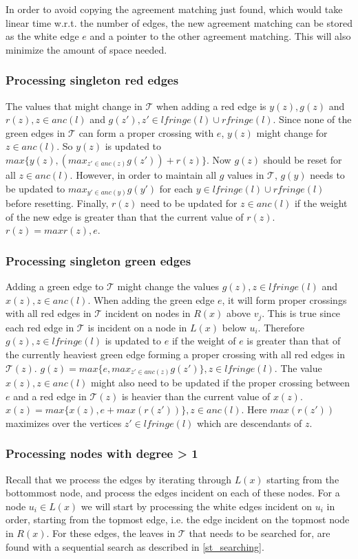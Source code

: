 In order to avoid copying the agreement matching just found, which would take linear time w.r.t. the number of edges, the new agreement matching can be stored as the white edge $e$ and a pointer to the other agreement matching. This will also minimize the amount of space needed.

\subsubsection{Processing singleton red edges}
The values that might change in $\mathcal{T}$ when adding a red edge is $y(z), g(z)$ and $r(z), z \in anc(l)$ and $g(z'), z' \in lfringe(l) \cup rfringe(l)$. Since none of the green edges in $\mathcal{T}$ can form a proper crossing with $e$, $y(z)$ might change for $z \in anc(l)$. So $y(z)$ is updated to $max\{y(z), (max_{z' \in anc(z)} g(z')) + r(z)\}$. Now $g(z)$ should be reset for all $z \in anc(l)$. However, in order to maintain all $g$ values in $\mathcal{T}$, $g(y)$ needs to be updated to $max_{y' \in anc(y)} g(y')$ for each $y \in lfringe(l) \cup rfringe(l)$ before resetting. Finally, $r(z)$ need to be updated for $z \in anc(l)$ if the weight of the new edge is greater than that the current value of $r(z)$. $r(z)=max{r(z), e}$.

\subsubsection{Processing singleton green edges}
Adding a green edge to $\mathcal{T}$ might change the values $g(z), z \in lfringe(l)$ and $x(z), z \in anc(l)$. When adding the green edge $e$, it will form proper crossings with all red edges in $\mathcal{T}$ incident on nodes in $R(x)$ above $v_j$. This is true since each red edge in $\mathcal{T}$ is incident on a node in $L(x)$ below $u_i$. Therefore $g(z), z \in lfringe(l)$ is updated to $e$ if the weight of $e$ is greater than that of the currently heaviest green edge forming a proper crossing with all red edges in $\mathcal{T}(z)$. $g(z)=max\{e, max_{z' \in anc(z)} g(z')\}, z \in lfringe(l)$. The value $x(z), z \in anc(l)$ might also need to be updated if the proper crossing between $e$ and a red edge in $\mathcal{T}(z)$ is heavier than the current value of $x(z)$. $x(z)=max\{x(z), e + max(r(z'))\}, z \in anc(l)$. Here $max(r(z'))$ maximizes over the vertices $z' \in lfringe(l)$ which are descendants of $z$.

\subsubsection{Processing nodes with degree > 1}
Recall that we process the edges by iterating through $L(x)$ starting from the bottommost node, and process the edges incident on each of these nodes. For a node $u_i \in L(x)$ we will start by processing the white edges incident on $u_i$ in order, starting from the topmost edge, i.e. the edge incident on the topmost node in $R(x)$. For these edges, the leaves in $\mathcal{T}$ that needs to be searched for, are found with a sequential search as described in \ref{st_searching}.

